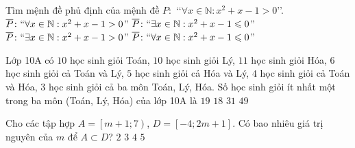 \begin{ex}%
	Tìm mệnh đề phủ định của mệnh đề $P\colon$ \lq\lq$\forall x\in \mathbb{N}:x^2+x-1>0$\rq\rq.
	\choice
	{$\overline{P}\colon ``\forall x\in \mathbb{N}:x^2+x-1>0$''}
	{\True $\overline{P}\colon ``\exists x\in \mathbb{N}:x^2+x-1\leqslant 0$''}
	{$\overline{P}\colon ``\exists x\in \mathbb{N}:x^2+x-1>0$''}
	{$\overline{P}\colon ``\forall x\in \mathbb{N}:x^2+x-1\leqslant 0$''}
\end{ex}
\begin{ex}%
	Lớp 10A có $10$ học sinh giỏi Toán, $10$ học sinh giỏi Lý, $11$ học sinh giỏi Hóa, $6$ học sinh giỏi cả Toán và Lý, $5$ học sinh giỏi cả Hóa và Lý, $4$ học sinh giỏi cả Toán và Hóa, $3$ học sinh giỏi cả ba môn Toán, Lý, Hóa. Số học sinh giỏi ít nhất một trong ba môn (Toán, Lý, Hóa) của lớp 10A là
	\choice
	{\True $19$}
	{$18$}
	{$31$}
	{$49$}
\end{ex}

\begin{ex}%
	Cho các  tập hợp $A=\left[m+1;7\right)$, $D=\left[-4;2m+1\right]$. Có bao nhiêu giá trị nguyên của $m$ để $A\subset D$?
	\choice
	{$ 2$}
	{\True $ 3 $}
	{$ 4 $}
	{$5 $}
\end{ex}

